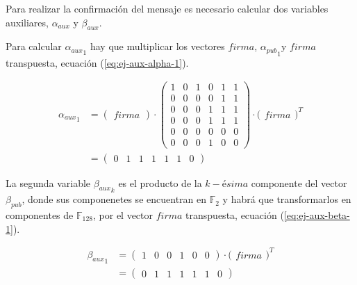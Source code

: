 Para realizar la confirmación del mensaje es necesario calcular dos variables auxiliares, $\alpha_{aux}$ y $\beta_{aux}$.

Para calcular ${\alpha_{aux}}_1$ hay que multiplicar los vectores $firma$, ${\alpha_{pub}}_1$y $firma$ transpuesta, ecuación (\ref{eq:ej-aux-alpha-1}).

\begin{equation}\label{eq:ej-aux-alpha-1}
	\begin{aligned}
	{{\alpha_{aux}}_1} & = 
		\begin{pmatrix}firma\end{pmatrix}
		\cdot \left(\begin{smallmatrix}
			1 & 0 & 1 & 0 & 1 & 1\\
			0 & 0 & 0 & 0 & 1 & 1\\
			0 & 0 & 0 & 1 & 1 & 1\\
			0 & 0 & 0 & 1 & 1 & 1\\
			0 & 0 & 0 & 0 & 0 & 0\\
			0 & 0 & 0 & 1 & 0 & 0
		\end{smallmatrix}\right)
		\cdot \big(\begin{matrix}firma\end{matrix}\big)^{\scriptscriptstyle T}\\
		& = \left(\begin{smallmatrix}0 & 1 & 1 & 1 & 1 & 1 & 0\end{smallmatrix}\right)
	\end{aligned}
\end{equation}

La segunda variable ${\beta_{aux}}_k$ es el producto de la $k-ésima$ componente del vector $\beta_{pub}$, donde sus componenetes se encuentran en $\mathds{F}_2$ y habrá que transformarlos en componentes de $\mathds{F}_{128}$, por el vector $firma$ transpuesta, ecuación (\ref{eq:ej-aux-beta-1}).

\begin{equation}\label{eq:ej-aux-beta-1}
	\begin{aligned}
	{{\beta_{aux}}_1} & = 
		\left(\begin{smallmatrix}1 & 0 & 0 & 1 & 0 & 0\end{smallmatrix}\right)
		\cdot \big(\begin{matrix}firma\end{matrix}\big)^{\scriptscriptstyle T}\\
		& = \left(\begin{smallmatrix}0 & 1 & 1 & 1 & 1 & 1 & 0\end{smallmatrix}\right)
	\end{aligned}
\end{equation}

